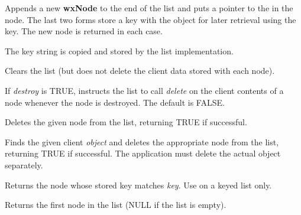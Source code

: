 

Appends a new {\bf wxNode} to the end of the list and puts a pointer to the
 in the node.  The last two forms store a key with the object for
later retrieval using the key. The new node is returned in each case.

The key string is copied and stored by the list implementation.



Clears the list (but does not delete the client data stored with each node).



If {\it destroy} is TRUE, instructs the list to call {\it delete} on the client contents of
a node whenever the node is destroyed. The default is FALSE.



Deletes the given node from the list, returning TRUE if successful.



Finds the given client {\it object} and deletes the appropriate node from the list, returning
TRUE if successful. The application must delete the actual object separately.




Returns the node whose stored key matches {\it key}. Use on a keyed list only.



Returns the first node in the list (NULL if the list is empty).



